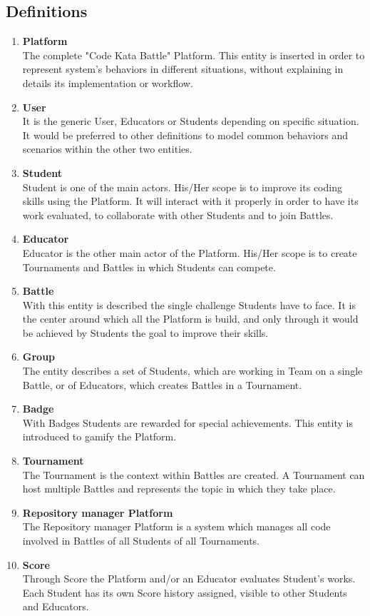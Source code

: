 \subsection{Definitions}
\begin{enumerate}[label=$\bullet$]
    \item \textbf{Platform}\\The complete "Code Kata Battle" Platform. This entity is inserted in order to represent system's behaviors in different situations, without explaining in details its implementation or workflow.
    \item \textbf{User}\\It is the generic User, Educators or Students depending on specific situation. It would be preferred to other definitions to model common behaviors and scenarios within the other two entities.
    \item \textbf{Student}\\Student is one of the main actors. His/Her scope is to improve its coding skills using the Platform. It will interact with it properly in order to have its work evaluated, to collaborate with other Students and to join Battles.
    \item \textbf{Educator}\\Educator is the other main actor of the Platform. His/Her scope is to create Tournaments and Battles in which Students can compete.
    \item \textbf{Battle}\\With this entity is described the single challenge Students have to face. It is the center around which all the Platform is build, and only through it would be achieved by Students the goal to improve their skills.
    \item \textbf{Group}\\The entity describes a set of Students, which are working in Team on a single Battle, or of Educators, which creates Battles in a Tournament.
    \item \textbf{Badge}\\With Badges Students are rewarded for special achievements. This entity is introduced to gamify the Platform.
    \item \textbf{Tournament}\\The Tournament is the context within Battles are created. A Tournament can host multiple Battles and represents the topic in which they take place.
    \item \textbf{Repository manager Platform}\\The Repository manager Platform is a system which manages all code involved in Battles of all Students of all Tournaments.
    \item \textbf{Score}\\Through Score the Platform and/or an Educator evaluates Student's works. Each Student has its own Score history assigned, visible to other Students and Educators.
\end{enumerate}
